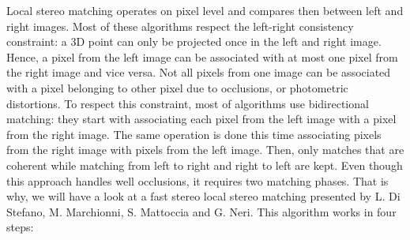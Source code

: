 \documentclass[11pt]{report}
\begin{document}
Local stereo matching operates on pixel level and compares then between left and right images. Most of these algorithms respect the left-right consistency constraint: a 3D point can only be projected once in the left and right image. Hence, a pixel from the left image can be associated with at most one pixel from the right image and vice versa. Not all pixels from one image can be associated with a pixel belonging to other pixel due to occlusions, or photometric distortions.
To respect this constraint, most of algorithms use bidirectional matching: they start with associating each pixel from the left image with a pixel from the right image. The same operation is done this time associating pixels from the right image with pixels from the left image. Then, only matches that are coherent while matching from left to right and right to left are kept. Even though this approach handles well occlusions, it requires two matching phases. That is why, we will have a look at a fast stereo local stereo matching presented by L. Di Stefano, M. Marchionni, S. Mattoccia and G. Neri\cite{Stefano02afast}.
This algorithm works in four steps:
\end{document}
